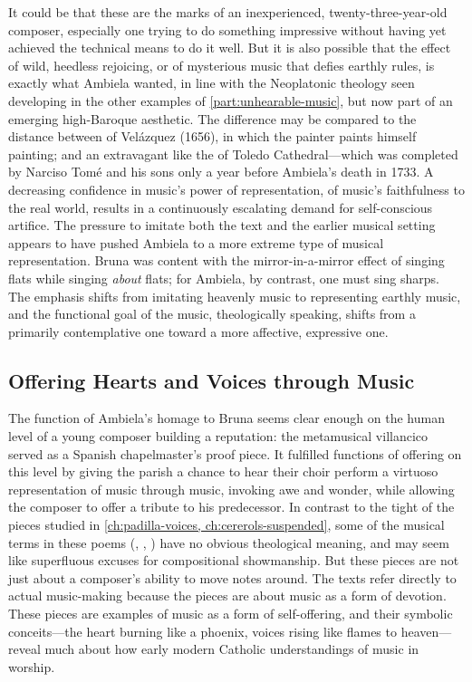 It could be that these are the marks of an inexperienced, twenty-three-year-old
composer, especially one trying to do something impressive without having yet
achieved the technical means to do it well.
But it is also possible that the effect of wild, heedless rejoicing, or of
mysterious music that defies earthly rules, is exactly what Ambiela wanted, in
line with the Neoplatonic theology seen developing in the other examples of
\cref{part:unhearable-music}, but now part of an emerging high-Baroque
aesthetic.  
The difference may be compared to the distance between  of
Velázquez (1656), in which the painter paints himself painting; and an
extravagant  like the  of Toledo
Cathedral---which was completed by Narciso Tomé and his sons only a year before
Ambiela's death in 1733.
A decreasing confidence in music's power of representation, of music's
faithfulness to the real world, results in a continuously escalating demand for
self-conscious artifice.  
The pressure to imitate both the text and the earlier musical setting appears
to have pushed Ambiela to a more extreme type of musical representation.
Bruna was content with the mirror-in-a-mirror effect of singing flats while
singing \emph{about} flats; for Ambiela, by contrast, one must sing sharps.
The emphasis shifts from imitating heavenly music to representing earthly
music, and the functional goal of the music, theologically speaking, shifts
from a primarily contemplative one toward a more affective, expressive one.

\subsection{Offering Hearts and Voices through Music}

The function of Ambiela's homage to Bruna seems clear enough on the human level
of a young composer building a reputation: the metamusical villancico served as
a Spanish chapelmaster's proof piece.
It fulfilled functions of offering on this level by giving the parish a chance
to hear their choir perform a virtuoso representation of music through music,
invoking awe and wonder, while allowing the composer to offer a tribute to his
predecessor.
In contrast to the tight  of the pieces studied in
\cref{ch:padilla-voices, ch:cererols-suspended}, some of the musical terms in
these poems (, , ) have no
obvious theological meaning, and may seem like superfluous excuses for
compositional showmanship.
But these pieces are not just about a composer's ability to move notes around.
The texts refer directly to actual music-making because the pieces are about
music as a form of devotion.
These pieces are examples of music as a form of self-offering, and their
symbolic conceits---the heart burning like a phoenix, voices rising like flames
to heaven---reveal much about how early modern Catholic understandings of music
in worship.


